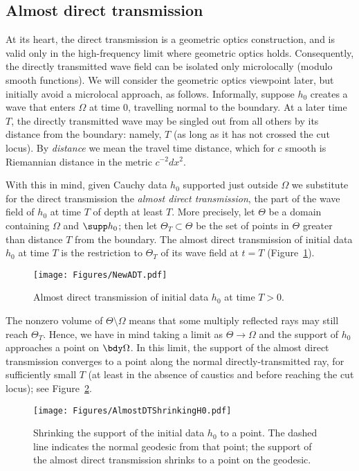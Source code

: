 \documentclass[10pt]{article}
\theoremstyle{plain}
\theoremstyle{definition}
\theoremstyle{remark}
\numberwithin{theorem}{section}
\numberwithin{example}{section}
\numberwithin{equation}{section}
\numberwithin{figure}{section}
\begin{document}
\subsection{Almost direct transmission}				\label{s:adt}

At its heart, the direct transmission is a geometric optics construction, and is valid only in the high-frequency limit where geometric optics holds. Consequently, the directly transmitted wave field can be isolated only microlocally (modulo smooth functions). We will consider the geometric optics viewpoint later, but initially avoid a microlocal approach, as follows. Informally, suppose $h_0$ creates a wave that enters $\Omega$ at time 0, travelling normal to the boundary. At a later time $T$, the directly transmitted wave may be singled out from all others by its distance from the boundary: namely, $T$ (as long as it has not crossed the cut locus). By \emph{distance} we mean the travel time distance, which for $c$ smooth is Riemannian distance in the metric $c^{-2}dx^2$.

With this in mind, given Cauchy data $h_0$ supported just outside $\Omega$ we substitute for the direct transmission the \emph{almost direct transmission}, the part of the wave field of $h_0$ at time $T$ of depth at least $T$. More precisely, let $\Theta$ be a domain containing $\Omega$ and $\supp h_0$; then let $\Theta_T\subset\Theta$ be the set of points in $\Theta$ greater than distance $T$ from the boundary. The almost direct transmission of initial data $h_0$ at time $T$ is the restriction to $\Theta_T$ of its wave field at $t=T$ (Figure~\ref{f:adt}). 

\begin{figure}[tb]
	\centering
	\texttt{[image: Figures/NewADT.pdf]}
	\caption{Almost direct transmission of initial data $h_0$ at time $T>0$.}
	\label{f:adt}
\end{figure}

The nonzero volume of $\Theta\setminus\Omega$ means that some multiply reflected rays may still reach $\Theta_T$. Hence, we have in mind taking a limit as $\Theta\to\Omega$ and the support of $h_0$ approaches a point on $\bdy\Omega$. In this limit, the support of the almost direct transmission converges to a point along the normal directly-transmitted ray, for sufficiently small $T$ (at least in the absence of caustics and before reaching the cut locus); see Figure~\ref{f:adt-shrink}.

\begin{figure}[tb]
	\centering
	\vspace*{0.125in}
	\texttt{[image: Figures/AlmostDTShrinkingH0.pdf]}
	\caption{Shrinking the support of the initial data $h_0$ to a point. The dashed line indicates the normal geodesic from that point; the support of the almost direct transmission shrinks to a point on the geodesic.}
	\label{f:adt-shrink}
\end{figure}
\end{document}
